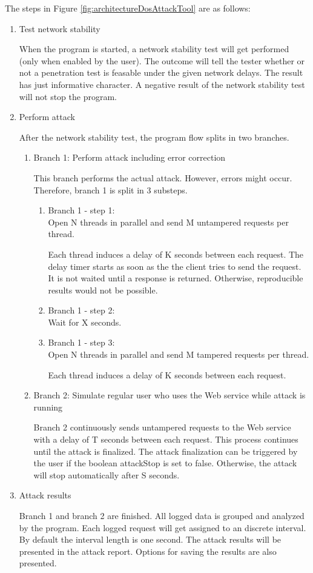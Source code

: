 The steps in Figure \ref{fig:architectureDosAttackTool} are as follows:
  \begin{enumerate}
    \item Test network stability\par When the program is started, a network stability test will get performed (only when enabled by the user). The outcome will tell the tester whether or not a penetration test is feasable under the given network delays. The result has just informative character. A negative result of the network stability test will not stop the program. 
    \item Perform attack\par After the network stability test, the program flow splits in two branches.  
    \begin{enumerate}
      \item Branch 1: Perform attack including error correction\par This branch performs the actual attack. However, errors might occur. Therefore, branch 1 is split in 3 substeps.
      \begin{enumerate}
	\item Branch 1 - step 1:\\Open N threads in parallel and send M untampered requests per thread.\par Each thread induces a delay of K seconds between each request. The delay timer starts as soon as the the client tries to send the request. It is not waited until a response is returned. Otherwise, reproducible results would not be possible.
	\item Branch 1 - step 2:\\Wait for X seconds. 
	\item Branch 1 - step 3:\\Open N threads in parallel and send M tampered requests per thread.\par Each thread induces a delay of K seconds between each request.
      \end{enumerate}  
      \item Branch 2: Simulate regular user who uses the Web service while attack is running\par Branch 2 continuously sends untampered requests to the Web service with a delay of T seconds between each request. This process continues until the attack is finalized.  The attack finalization can be triggered by the user if the boolean attackStop is set to false. Otherwise, the attack will stop automatically after S seconds.
    \end{enumerate}
    \item Attack results\par Branch 1 and branch 2 are finished. All logged data is grouped and analyzed by the program. Each logged request will get assigned to an discrete interval. By default the interval length is one second. 
    The attack results will be presented in the attack report. Options for saving the results are also presented.
  \end{enumerate}


